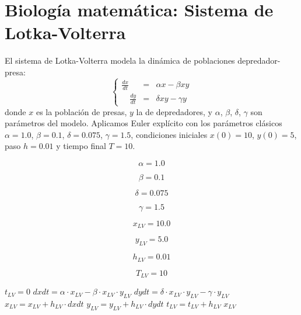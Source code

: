 \documentclass{article}
\begin{document}
\section{Biología matemática: Sistema de Lotka-Volterra}

El sistema de Lotka-Volterra modela la dinámica de poblaciones depredador-presa:
\[
\left \{
\begin{array}{rrrr}
    \frac{dx}{dt} & = &\alpha x - \beta x y \\
    \quad \frac{dy}{dt} & = &\delta x y - \gamma y
\end{array}
\right .
\]
donde $x$ es la población de presas, $y$ la de depredadores, y $\alpha$, $\beta$,
$\delta$, $\gamma$ son parámetros del modelo. Aplicamos Euler explícito con los
parámetros clásicos $\alpha = 1.0$, $\beta = 0.1$, $\delta = 0.075$, $\gamma = 1.5$,
condiciones iniciales $x(0) = 10$, $y(0) = 5$, paso $h = 0.01$ y tiempo final $T = 10$.

\begin{equation}
    \alpha = 1.0
    \label{eq:calc:alpha}
\end{equation}

\begin{equation}
    \beta = 0.1
    \label{eq:calc:beta}
\end{equation}

\begin{equation}
    \delta = 0.075
    \label{eq:calc:delta}
\end{equation}

\begin{equation}
    \gamma = 1.5
    \label{eq:calc:gamma}
\end{equation}

\begin{equation}
    x_{LV} = 10.0
    \label{eq:calc:xlv}
\end{equation}

\begin{equation}
    y_{LV} = 5.0
    \label{eq:calc:ylv}
\end{equation}

\begin{equation}
    h_{LV} = 0.01
    \label{eq:calc:hlv}
\end{equation}

\begin{equation}
    T_{LV} = 10
    \label{eq:calc:Tlv}
\end{equation}

\begin{algorithm}
\caption{Euler explícito para el sistema de Lotka-Volterra}
\begin{algorithmic}
    \STATE $t_{LV} = 0$
        \STATE $dxdt = \alpha \cdot x_{LV} - \beta \cdot x_{LV} \cdot y_{LV}$
        \STATE $dydt = \delta \cdot x_{LV} \cdot y_{LV} - \gamma \cdot y_{LV}$
        \STATE $x_{LV} = x_{LV} + h_{LV} \cdot dxdt$
        \STATE $y_{LV} = y_{LV} + h_{LV} \cdot dydt$
        \STATE $t_{LV} = t_{LV} + h_{LV}$
    \ENDWHILE
    \RETURN $x_{LV}$
\end{algorithmic}
\end{algorithm}
\end{document}

